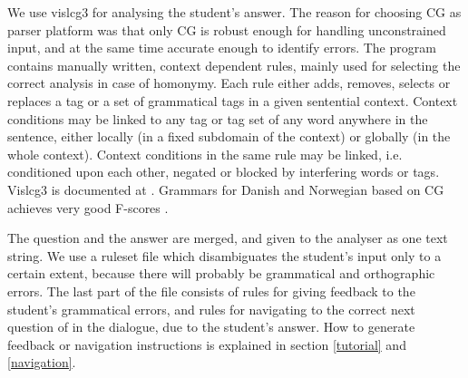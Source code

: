 \documentclass[11pt]{article}
\begin{document}
%
%
%

We use vislcg3 for analysing the student's answer. The reason for choosing CG as parser platform was that only CG is robust enough for handling unconstrained input, and at the same time accurate enough to identify errors. The program contains manually written, context dependent rules, mainly used for selecting the correct analysis in case of homonymy. Each rule either adds, removes, selects or replaces a tag or a set of grammatical tags in a given sentential context. Context conditions may be linked to any tag or tag set of any word anywhere in the sentence, either locally (in a fixed subdomain of the context) or globally (in the whole context). Context conditions in the same rule may be linked, i.e. conditioned upon each other, negated or blocked by interfering words or tags. Vislcg3 is documented at \cite{Visl:08}. Grammars for Danish and Norwegian based on CG achieves very good F-scores \cite{Bick:04}.

The question and the answer are merged, and given to the analyser as one text string. We use a ruleset file which disambiguates the student's input only to a certain extent, because there will probably be grammatical and orthographic errors. The last part of the file consists of rules for giving feedback to the student's grammatical errors, and rules for navigating to the correct next question of in the dialogue, due to the student's answer. How to generate feedback or navigation instructions is explained in section \ref{tutorial} and \ref{navigation}.
\end{document}
